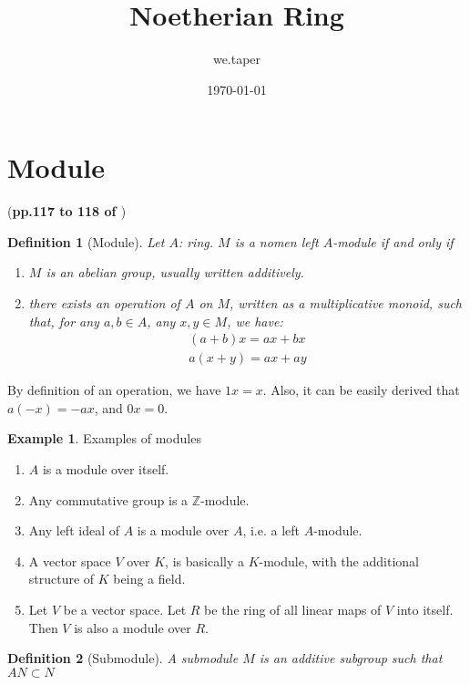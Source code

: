 \documentclass{article}
\title{Noetherian Ring}
\date{\today}
\author{we.taper}
\numberwithin{equation}{subsection} %
\newtheorem{defi}{Definition}[section]
\theoremstyle{definition}
\newtheorem{ex}{Example}[section]
\begin{document}
\maketitle
{}
\tableofcontents

\section{Module}
\label{sec:Module}
(\textbf{pp.117 to 118 of \cite{lang}})
\begin{defi}[Module]
Let $A$: ring. $M$ is a nomen left $A$-module if and only if 
\begin{enumerate}
    \item $M$ is an abelian group, usually written additively.
    \item there exists an operation of $A$ on $M$, written as a
        multiplicative monoid, such that, for any $a,b\in A$, any
        $x,y \in M$, we have:
        \begin{align}
            (a+b) x = ax + bx\\
            a(x+y) = ax + ay
        \end{align}
\end{enumerate}
\end{defi}

By definition of an operation, we have $1x = x$. Also, it can be easily
derived that $a(-x) = -ax$, and $0x=0$.

\begin{ex}{Examples of modules}
    \begin{enumerate}
        \item $A$ is a module over itself.
        \item Any commutative group is a $\mathbb{Z}$-module.
        \item Any left ideal of $A$ is a module over $A$, i.e. a left
            $A$-module.
        \item A vector space $V$ over $K$, is basically a $K$-module,
            with the additional structure of $K$ being a field.
        \item Let $V$ be a vector space. 
            Let $R$ be the ring of all linear maps of $V$ into itself.
            Then $V$ is also a module over $R$.
    \end{enumerate}
\end{ex}

\begin{defi}[Submodule]
    A submodule $M$ is an additive subgroup such that 
    $AN\subset N$
\end{defi}
\end{document}
